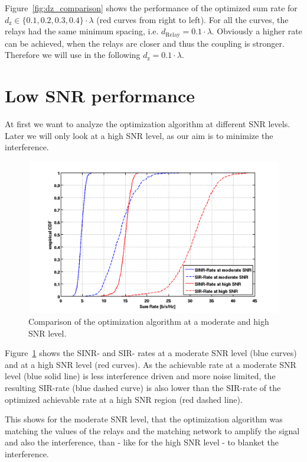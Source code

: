 Figure~\ref{fig:dz_comparison} shows the performance of the optimized sum rate for $d_\text{z}\in\{0.1,0.2,0.3,0.4\}\cdot\lambda$ (red curves from right to left).
For all the curves, the relays had the same minimum spacing, i.e. $d_\text{Relay}=0.1\cdot\lambda$.
Obviously a higher rate can be achieved, when the relays are closer and thus the coupling is stronger.
Therefore we will use in the following $d_\text{z}=0.1\cdot\lambda$.


\section{Low SNR performance}
\label{sec:low_snr}

At first we want to analyze the optimization algorithm at different SNR levels.
Later we will only look at a high SNR level, as our aim is to minimize the interference.
\begin{figure}[h]
\centering
  \includegraphics[width=0.9\linewidth]{images/Comparison_modvshighSNR.png}
\caption{Comparison of the optimization algorithm at a moderate and high SNR level.}
\label{fig:snrcomparison}
\end{figure}

Figure~\ref{fig:snrcomparison} shows the SINR- and SIR- rates at a moderate SNR level (blue curves) and at a high SNR level (red curves).
As the achievable rate at a moderate SNR level (blue solid line) is less interference driven and more noise limited, the resulting SIR-rate (blue dashed curve) is also lower than the SIR-rate of the optimized achievable rate at a high SNR region (red dashed line).

This shows for the moderate SNR level, that the optimization algorithm was matching the values of the relays and the matching network to amplify the signal and also the interference, than - like for the high SNR level - to blanket the interference.

